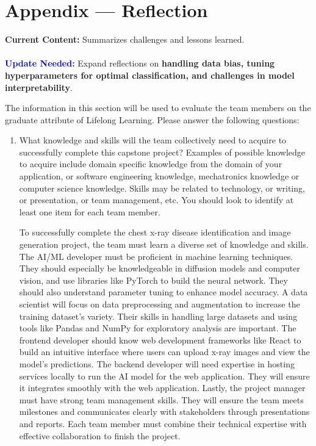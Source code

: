 \documentclass[12pt]{article}
\begin{document}
\newpage{}
\section*{Appendix --- Reflection}

\textbf{Current Content:} Summarizes challenges and lessons learned. \\
\\
\textbf{\textcolor{blue}{Update Needed:}} Expand reflections on \textbf{handling data bias, tuning hyperparameters for optimal classification, and challenges in model interpretability}.


The information in this section will be used to evaluate the team members on the
graduate attribute of Lifelong Learning.  Please answer the following questions:

\begin{enumerate}
  \item What knowledge and skills will the team collectively need to acquire to
  successfully complete this capstone project?  Examples of possible knowledge
  to acquire include domain specific knowledge from the domain of your
  application, or software engineering knowledge, mechatronics knowledge or
  computer science knowledge.  Skills may be related to technology, or writing,
  or presentation, or team management, etc.  You should look to identify at
  least one item for each team member.

  To successfully complete the chest x-ray disease identification and image generation project, 
  the team must learn a diverse set of knowledge and skills. The AI/ML developer must be 
  proficient in machine learning techniques. They should especially be knowledgeable in diffusion 
  models and computer vision, and use libraries like PyTorch to build the neural network. They 
  should also understand parameter tuning to enhance model accuracy. A data scientist will focus 
  on data preprocessing and augmentation to increase the training dataset’s variety. Their skills 
  in handling large datasets and using tools like Pandas and NumPy for exploratory analysis are 
  important. The frontend developer should know web development frameworks like React to build an 
  intuitive interface where users can upload x-ray images and view the model’s predictions. The 
  backend developer will need expertise in hosting services locally to run the AI model for the 
  web application. They will ensure it integrates smoothly with the web application. Lastly, the 
  project manager must have strong team management skills. They will ensure the team meets 
  milestones and communicates clearly with stakeholders through presentations and reports. Each 
  team member must combine their technical expertise with effective collaboration to finish the 
  project.


\end{enumerate}
\end{document}
